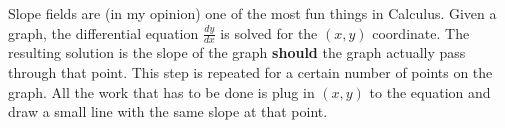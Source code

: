\documentclass[../revisedmain.tex]{subfiles}
\begin{document}
	Slope fields are (in my opinion) one of the most fun things in Calculus. Given a graph, the differential equation $\displaystyle\frac{dy}{dx}$ is solved for the $(x,y)$ coordinate. The resulting solution is the slope of the graph \textbf{should} the graph actually pass through that point. This step is repeated for a certain number of points on the graph. All the work that has to be done is plug in $(x,y)$ to the equation and draw a small line with the same slope at that point.\\
\end{document}
